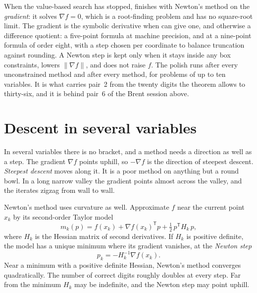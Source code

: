 When the value-based search has stopped,  finishes with Newton's
method on the \emph{gradient}: it solves \(\nabla f = 0\), which is a root-finding
problem and has no square-root limit. The gradient
is the symbolic derivative when  can give one, and otherwise a difference
quotient: a five-point formula at machine precision, and at
 a nine-point formula of order eight, with a step chosen per
coordinate to balance truncation against rounding. A Newton step is kept only when it
stays inside any box constraints, lowers \(\lVert\nabla f\rVert\), and does not raise
\(f\). The polish runs after every unconstrained method and after every
 method, for problems of up to ten variables. It is what carries pair~2
from the twenty digits the theorem allows to thirty-six, and it is behind pair~6 of the
Brent session above.


\section{Descent in several variables}
\label{sec:opt-descent}

In several variables there is no bracket, and a method needs a direction as well
as a step. The gradient \(\nabla f\) points uphill, so \(-\nabla f\) is the
direction of steepest descent. \emph{Steepest descent} moves along it. It is a
poor method on anything but a round bowl. In a long narrow valley the gradient
points almost across the valley, and the iterates zigzag from wall to wall.

Newton's method uses curvature as well. Approximate \(f\) near the current
point \(x_k\) by its second-order Taylor model
\[
  m_k(p) = f(x_k) + \nabla f(x_k)^{\mathsf T} p + \tfrac12\, p^{\mathsf T} H_k\, p ,
\]
where \(H_k\) is the Hessian matrix of second derivatives. If \(H_k\) is
positive definite, the model has a unique minimum where its gradient vanishes,
at the \emph{Newton step}
\[
  p_k = -H_k^{-1} \nabla f(x_k).
\]
Near a minimum with a positive definite Hessian, Newton's method converges
quadratically. The number of correct digits roughly doubles at every step. Far
from the minimum \(H_k\) may be indefinite, and the Newton step may point
uphill.

